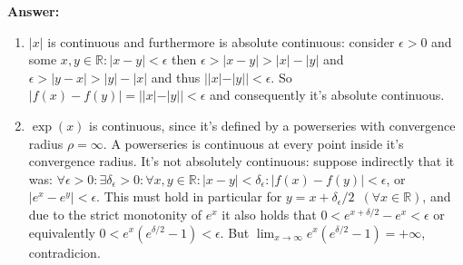 \documentclass[11pt]{article}
\newcommand{\abs}[1]{\left|#1\right|}
\begin{document}
\begin{enumerate}
\textbf{Answer:}
\begin{enumerate}
    \item $|x|$ is continuous and furthermore is absolute continuous: consider $\epsilon > 0$ and some $x, y \in \mathbb{R}\colon |x - y| < \epsilon$ then $\epsilon > |x - y| > |x| - |y|$ and $\epsilon > |y - x| > |y| - |x|$ and thus $||x| - |y|| < \epsilon$. So $|f(x) - f(y)| = ||x| - |y|| < \epsilon$ and consequently it's absolute continuous.
    \item $\operatorname{exp}(x)$ is continuous, since it's defined by a powerseries with convergence radius $\rho = \infty$. A powerseries is continuous at every point inside it's convergence radius. It's not absolutely continuous: suppose indirectly that it was: $\forall \epsilon > 0\colon \exists \delta_\epsilon >0\colon \forall x, y \in \mathbb{R}: \abs{x - y} < \delta_\epsilon\colon \abs{f(x) - f(y)} < \epsilon$, or $\abs{e^x - e^y} < \epsilon$. This must hold in particular for $y = x + \delta_\epsilon/2\phantom{0}(\forall x \in \mathbb{R})$, and due to the strict monotonity of $e^x$ it also holds that $0 < e^{x+\delta/2} - e^x < \epsilon$ or equivalently $0 < e^x(e^{\delta/2} - 1) < \epsilon$. But $\lim_{x\to\infty} e^x(e^{\delta/2} - 1) = +\infty$, contradicion.


\end{enumerate}
\end{enumerate}
\end{document}
